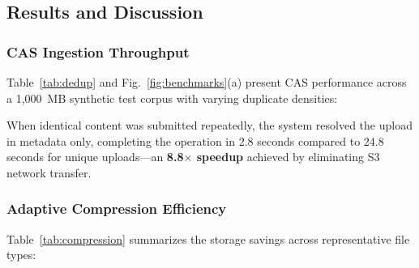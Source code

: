 \documentclass[conference]{IEEEtran}
\begin{document}
\subsection{Results and Discussion}

\subsubsection{CAS Ingestion Throughput}
Table~\ref{tab:dedup} and Fig.~\ref{fig:benchmarks}(a) present CAS performance across a 1,000~MB synthetic test corpus with varying duplicate densities:

\begin{table}[htbp]
\caption{CAS Deduplication Efficiency \& Ingestion Throughput}
\label{tab:dedup}
\centering
{}
\end{table}

When identical content was submitted repeatedly, the system resolved the upload in metadata only, completing the operation in 2.8 seconds compared to 24.8 seconds for unique uploads---an \textbf{8.8$\times$ speedup} achieved by eliminating S3 network transfer.

\subsubsection{Adaptive Compression Efficiency}
Table~\ref{tab:compression} summarizes the storage savings across representative file types:
\end{document}
